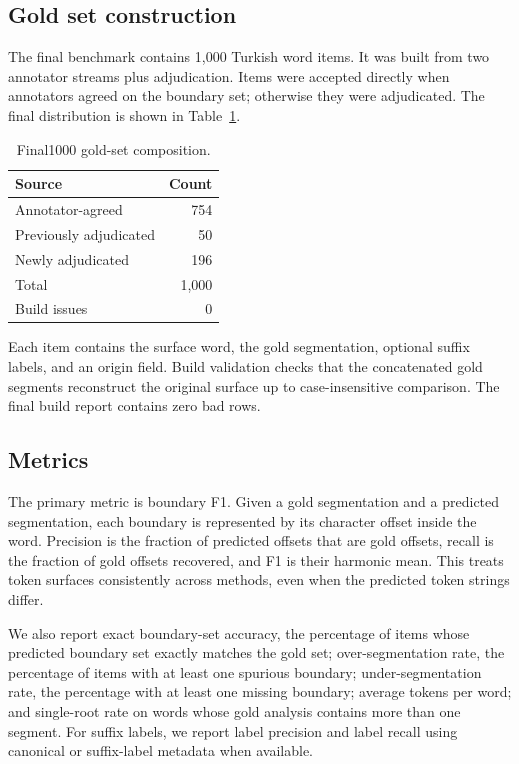 \documentclass[11pt]{article}
\begin{document}
\subsection{Gold set construction}
The final benchmark contains 1,000 Turkish word items. It was built from two annotator streams plus adjudication. Items were accepted directly when annotators agreed on the boundary set; otherwise they were adjudicated. The final distribution is shown in Table~\ref{tab:gold}.

\begin{table}[h]
\centering
\caption{Final1000 gold-set composition.}
\label{tab:gold}
\begin{tabular}{lr}
\toprule
Source & Count \\
\midrule
Annotator-agreed & 754 \\
Previously adjudicated & 50 \\
Newly adjudicated & 196 \\
\midrule
Total & 1,000 \\
Build issues & 0 \\
\bottomrule
\end{tabular}
\end{table}

Each item contains the surface word, the gold segmentation, optional suffix labels, and an origin field. Build validation checks that the concatenated gold segments reconstruct the original surface up to case-insensitive comparison. The final build report contains zero bad rows.

\subsection{Metrics}
The primary metric is boundary F1. Given a gold segmentation and a predicted segmentation, each boundary is represented by its character offset inside the word. Precision is the fraction of predicted offsets that are gold offsets, recall is the fraction of gold offsets recovered, and F1 is their harmonic mean. This treats token surfaces consistently across methods, even when the predicted token strings differ.

We also report exact boundary-set accuracy, the percentage of items whose predicted boundary set exactly matches the gold set; over-segmentation rate, the percentage of items with at least one spurious boundary; under-segmentation rate, the percentage with at least one missing boundary; average tokens per word; and single-root rate on words whose gold analysis contains more than one segment. For suffix labels, we report label precision and label recall using canonical or suffix-label metadata when available.
\end{document}

